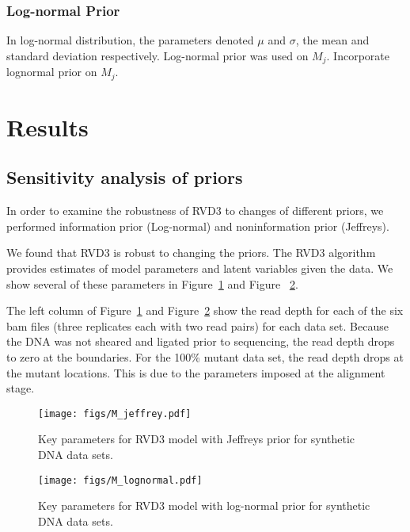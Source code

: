 \documentclass[11pt,reqno]{amsart}
\begin{document}
\subsubsection{Log-normal Prior}
In log-normal distribution, the parameters denoted $\mu$ and $\sigma$, the mean and standard deviation respectively. Log-normal prior was used on $ M_{j}$.
Incorporate lognormal prior on $M_{j}$.


\section{Results}

\subsection{Sensitivity analysis of priors}
In order to examine the robustness of RVD3 to changes of different priors, we performed information prior (Log-normal) and noninformation prior (Jeffreys).

We found that RVD3 is robust to changing the priors.
The RVD3 algorithm provides estimates of model parameters and latent variables given the data. We show several of these parameters in Figure~\ref{fig:M_jeffrey} and Figure ~\ref{fig:M_lognormal}.

The left column of Figure~\ref{fig:M_jeffrey} and Figure~\ref{fig:M_lognormal} show the read depth for each of the six bam files (three replicates each with two read pairs) for each data set. Because the DNA was not sheared and ligated prior to sequencing, the read depth drops to zero at the boundaries. For the 100\% mutant data set, the read depth drops at the mutant locations. This is due to the parameters imposed at the alignment stage.

\begin{figure}[htbp]
\begin{center}
\texttt{[image: figs/M\_jeffrey.pdf]}
\caption{Key parameters for RVD3 model with Jeffreys prior for synthetic DNA data sets.}
\label{fig:M_jeffrey}
\end{center}
\end{figure}

\begin{figure}[htbp]
\begin{center}
\texttt{[image: figs/M\_lognormal.pdf]}
\caption{Key parameters for RVD3 model with log-normal prior for synthetic DNA data sets.}
\label{fig:M_lognormal}
\end{center}
\end{figure}
\end{document}
